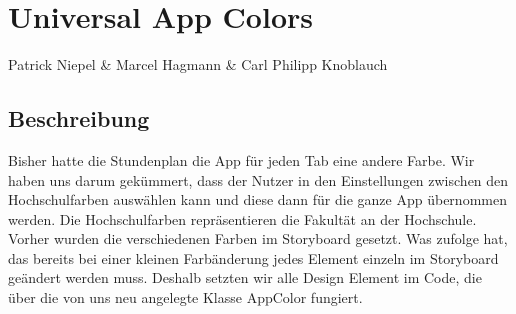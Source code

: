 \chapter{Universal App Colors}
Patrick Niepel \& Marcel Hagmann \& Carl Philipp Knoblauch

\section{Beschreibung}
Bisher hatte die Stundenplan die App für jeden Tab eine andere Farbe. Wir haben uns darum gekümmert, dass der Nutzer in den Einstellungen  zwischen den Hochschulfarben auswählen kann und diese dann für die ganze App übernommen werden. Die Hochschulfarben repräsentieren die Fakultät an der Hochschule. Vorher wurden die verschiedenen Farben im Storyboard gesetzt. Was zufolge hat, das bereits bei einer kleinen Farbänderung jedes Element einzeln im Storyboard geändert werden muss.
Deshalb setzten wir alle Design Element im Code, die über die von uns neu angelegte Klasse AppColor fungiert.

